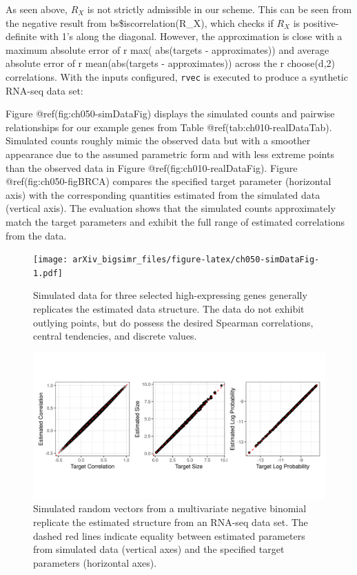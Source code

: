 \documentclass{article}
\newenvironment{Shaded}{\begin{snugshade}}{\end{snugshade}}
\newcommand{\DecValTok}[1]{\textcolor[rgb]{0.00,0.00,0.81}{#1}}
\newcommand{\FunctionTok}[1]{\textcolor[rgb]{0.00,0.00,0.00}{#1}}
\newcommand{\NormalTok}[1]{#1}
\newcommand{\OtherTok}[1]{\textcolor[rgb]{0.56,0.35,0.01}{#1}}
\newcommand{\SpecialCharTok}[1]{\textcolor[rgb]{0.00,0.00,0.00}{#1}}
\begin{document}
As seen above, \(R_X\) is not strictly admissible in our scheme. This
can be seen from the negative result from bs\$iscorrelation(R\_X), which
checks if \(R_X\) is positive-definite with 1's along the diagonal.
However, the approximation is close with a maximum absolute error of r
max( abs(targets - approximates)) and average absolute error of r
mean(abs(targets - approximates)) across the r choose(d,2) correlations.
With the inputs configured, \texttt{rvec} is executed to produce a
synthetic RNA-seq data set:

\begin{Shaded}
\end{Shaded}

Figure @ref(fig:ch050-simDataFig) displays the simulated counts and
pairwise relationships for our example genes from Table
@ref(tab:ch010-realDataTab). Simulated counts roughly mimic the observed
data but with a smoother appearance due to the assumed parametric form
and with less extreme points than the observed data in Figure
@ref(fig:ch010-realDataFig). Figure @ref(fig:ch050-figBRCA) compares the
specified target parameter (horizontal axis) with the corresponding
quantities estimated from the simulated data (vertical axis). The
evaluation shows that the simulated counts approximately match the
target parameters and exhibit the full range of estimated correlations
from the data.

\begin{figure}
\centering
\texttt{[image: arXiv\_bigsimr\_files/figure-latex/ch050-simDataFig-1.pdf]}
\caption{Simulated data for three selected high-expressing genes
generally replicates the estimated data structure. The data do not
exhibit outlying points, but do possess the desired Spearman
correlations, central tendencies, and discrete values.}
\end{figure}

\begin{figure}
\includegraphics[width=0.8\linewidth]{../fig/ch050-figBRCA} \caption{Simulated random vectors from a multivariate negative binomial replicate the estimated structure from an RNA-seq data set. The dashed red lines indicate equality between estimated parameters from simulated data (vertical axes) and the specified target parameters (horizontal axes).}\label{fig:ch050-figBRCA}
\end{figure}
\end{document}
